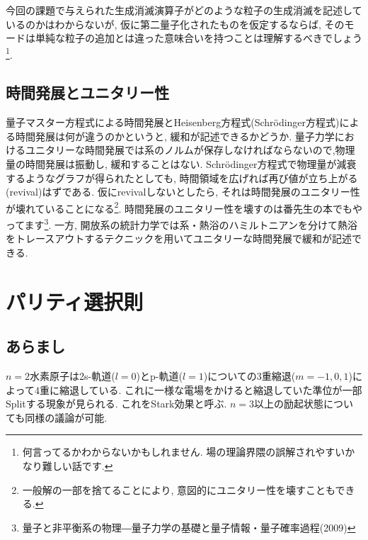 \documentclass[10.5pt,a4paper]{jreport}
\begin{document}
今回の課題で与えられた生成消滅演算子がどのような粒子の生成消滅を記述しているのかはわからないが, 仮に第二量子化されたものを仮定するならば, そのモードは単純な粒子の追加とは違った意味合いを持つことは理解するべきでしょう\footnote{何言ってるかわからないかもしれません. 場の理論界隈の誤解されやすいかなり難しい話です.}.

\subsection{時間発展とユニタリー性}
量子マスター方程式による時間発展とHeisenberg方程式(Schr\"odinger方程式)による時間発展は何が違うのかというと, 緩和が記述できるかどうか. 量子力学におけるユニタリーな時間発展では系のノルムが保存しなければならないので,物理量の時間発展は振動し, 緩和することはない. Schr\"odinger方程式で物理量が減衰するようなグラフが得られたとしても, 時間領域を広げれば再び値が立ち上がる(revival)はずである. 仮にrevivalしないとしたら, それは時間発展のユニタリー性が壊れていることになる\footnote{一般解の一部を捨てることにより, 意図的にユニタリー性を壊すこともできる.}. 時間発展のユニタリー性を壊すのは番先生の本でもやってます\footnote{量子と非平衡系の物理―量子力学の基礎と量子情報・量子確率過程(2009)}. 一方, 開放系の統計力学では系・熱浴のハミルトニアンを分けて熱浴をトレースアウトするテクニックを用いてユニタリーな時間発展で緩和が記述できる.

\section{パリティ選択則}
\subsection{あらまし}
$n=2$水素原子は2s-軌道($l=0$)とp-軌道($l=1$)についての3重縮退($m=-1,0,1$)によって4重に縮退している. これに一様な電場をかけると縮退していた準位が一部Splitする現象が見られる. これをStark効果と呼ぶ. $n=3$以上の励起状態についても同様の議論が可能.
\end{document}

